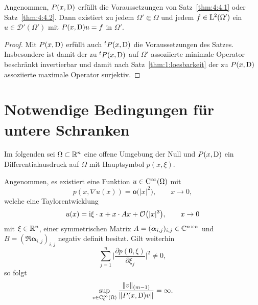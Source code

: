 \begin{cor}
Angenommen, $P(x,\mathrm D)$ erfüllt die Voraussetzungen von Satz~\ref{thm:4:4.1} oder Satz~\ref{thm:4:4.2}. Dann existiert zu jedem $\Omega'\Subset\Omega$ und jedem
$f\in\mathrm L^2(\Omega')$ ein $u\in\mathscr D'(\Omega')$ mit $P(x,\mathrm D)u=f$ in $\Omega'$.
\end{cor}
\begin{proof}
Mit $P(x,\mathrm D)$ erfüllt auch ${}^tP(x,\mathrm D)$ die Voraussetzungen des Satzes. Insbesondere ist damit der zu ${}^tP(x,\mathrm D)$ auf $\Omega'$ assoziierte minimale Operator beschränkt invertierbar und damit nach Satz~\ref{thm:1:loesbarkeit} der zu $P(x,\mathrm D)$ assoziierte maximale Operator surjektiv.
\end{proof}

\section{Notwendige Bedingungen für untere Schranken}
Im folgenden sei $\Omega \subset \mathbb R^n$ eine offene Umgebung der Null und $P(x,\mathrm D)$ ein Differentialausdruck auf $\Omega$ mit Hauptsymbol $p(x,\xi)$. 
\begin{lem}\label{lem1:hoer2.2}
Angenommen, es existiert eine Funktion $u \in \mathrm C^\infty (\Omega)$ mit 
\begin{equation}
\label{grad}
p(x, \nabla u(x)) = \mathbf{o} \big(|x|^2\big), \qquad  x \rightarrow 0,
\end{equation}
welche eine Taylorentwicklung 
\begin{equation}\label{taylor}
u(x) = \mathrm i \xi\cdot x + x\cdot A x + \mathcal O\big(|x|^3\big),\qquad x\to0
\end{equation}
mit $\xi\in\mathbb R^n$, einer symmetrischen Matrix $A=(\boldsymbol\alpha_{i,j})_{i,j}\in\mathbb C^{n\times n}$ und $B = (\Re \boldsymbol\alpha_{i,j})_{i,j} $ negativ definit  besitzt. 
Gilt weiterhin  
\begin{equation}
\label{normpart}
\sum_{j=1}^{n}\bigg|\frac{\partial p(0,\xi)}{\partial \xi_j}\bigg|^2 \neq 0,
\end{equation}
so folgt
\begin{equation}
\label{lm 1 eq}
\sup_{v\in\mathrm C_0^\infty(\Omega)} \frac{ \lVert v \rVert_{(m-1)} }{ \lVert P(x,\mathrm D)v \rVert} = \infty.
\end{equation}
\end{lem}
